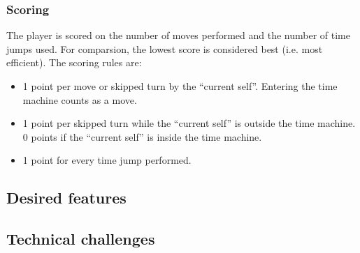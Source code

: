 \subsubsection{Scoring}
The player is scored on the number of moves performed and the number
of time jumps used.  For comparsion, the lowest score is considered
best (i.e. most efficient).  The scoring rules are:

\begin{itemize}
\item 1 point per move or skipped turn by the ``current self''.
  Entering the time machine counts as a move.
\item 1 point per skipped turn while the ``current self'' is outside
  the time machine.  0 points if the ``current self'' is inside the
  time machine.
\item 1 point for every time jump performed.
\end{itemize}

\subsection{Desired features}

\subsection{Technical challenges}

